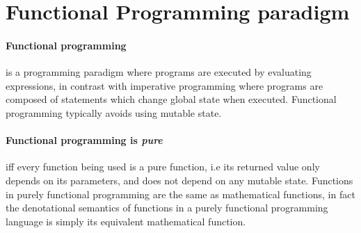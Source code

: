 \documentclass[../gr-final.tex]{subfiles}
\begin{document}
\section{Functional Programming paradigm}
\paragraph {Functional programming}is a programming paradigm where
programs are executed by evaluating expressions, in contrast with
imperative programming where programs are composed of statements
which change global state when executed. Functional programming
typically avoids using mutable state. 
\paragraph {Functional programming is {\it{\bfseries pure}}}iff every function being used is a pure function, i.e
its returned value only depends on its parameters, and does not
depend on any mutable state. Functions in purely functional
programming are the same as mathematical functions, in fact the
denotational semantics of functions in a purely functional
programming language is simply its equivalent mathematical function.
\end{document}
